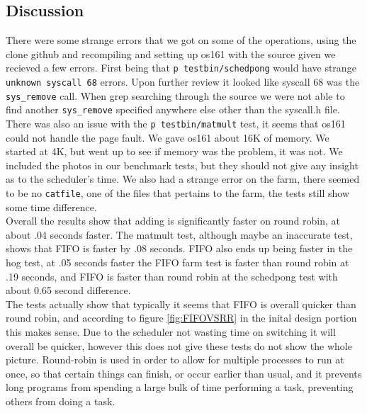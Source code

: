\documentclass[12pt]{article}
\newcommand\tab[1][1cm]{\hspace*{#1}}
\begin{document}
\subsection{Discussion}
\tab There were some strange errors that we got on some of the operations, using the clone
github and recompiling and setting up os161 with the source given we recieved a few errors.
First being that \texttt{p testbin/schedpong} would have strange \texttt{unknown syscall 68}
errors. Upon further review it looked like syscall 68 was the \texttt{sys\_remove} call. When
grep searching through the source we were not able to find another \texttt{sys\_remove}
specified anywhere else other than the syscall.h file. There was also an issue with the \texttt{p testbin/matmult} test, it seems that os161 could not handle the page fault. We gave os161 about 16K of memory. We started at 4K, but went up to see if memory was the problem, it was not. We included the photos in our benchmark tests, but they should not give any insight as to the scheduler's time. We also had a strange error on the farm, there seemed to be no \texttt{catfile}, one of the files that pertains to the farm, the tests still show some time difference. \\
\tab Overall the results show that adding is significantly faster on round robin, at about .04 seconds faster. The matmult test, although maybe an inaccurate test, shows that FIFO is faster by .08 seconds. FIFO also ends up being faster in the hog test, at .05 seconds faster the FIFO farm test is faster than round robin at .19 seconds, and FIFO is faster than round robin at the schedpong test with about 0.65 second difference. \\
\tab The tests actually show that typically it seems that FIFO is overall quicker than round robin, and according to figure \ref{fig:FIFOVSRR} in the inital design portion this makes sense. Due to the scheduler not wasting time on switching it will overall be quicker, however this does not give these tests do not show the whole picture. Round-robin is used in order to allow for multiple processes to run at once, so that certain things can finish, or occur earlier than usual, and it prevents long programs from spending a large bulk of time performing a task, preventing others from doing a task. 
\end{document}
